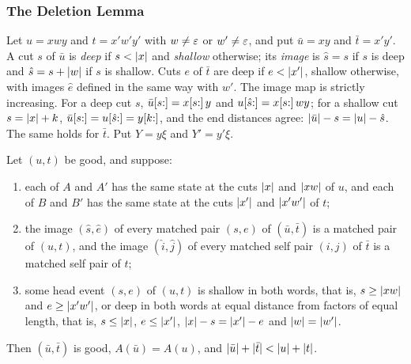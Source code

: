 \subsubsection{The Deletion Lemma}

Let $u=xwy$ and $t=x'w'y'$ with $w\ne\varepsilon$ or $w'\ne\varepsilon$, and put $\bar u=xy$
and $\bar t=x'y'$. A cut $s$ of $\bar u$ is \emph{deep} if $s<\lvert x\rvert$ and
\emph{shallow} otherwise; its \emph{image} is $\hat s=s$ if $s$ is deep and
$\hat s=s+\lvert w\rvert$ if $s$ is shallow. Cuts $e$ of $\bar t$ are deep if
$e<\lvert x'\rvert$, shallow otherwise, with images $\hat e$ defined in the same way
with $w'$. The image map is strictly increasing. For a deep cut $s$,
$\bar u[s{:}]=x[s{:}]\,y$ and $u[\hat s{:}]=x[s{:}]\,wy$; for a shallow
cut $s=\lvert x\rvert+k$, $\bar u[s{:}]=u[\hat s{:}]=y[k{:}]$, and the end
distances agree: $\lvert \bar u\rvert-s=\lvert u\rvert-\hat s$. The same holds for $\bar t$. Put
$Y=y\xi$ and $Y'=y'\xi$.

\begin{lemma}[Deletion]\label{lem:nm-deletion}
Let $(u,t)$ be good, and suppose:
\begin{enumerate}[label=(D\arabic*)]
\item each of $A$ and $A'$ has the same state at the cuts $\lvert x\rvert$ and
$\lvert xw\rvert$ of $u$, and each of $B$ and $B'$ has the same state at the cuts
$\lvert x'\rvert$ and $\lvert x'w'\rvert$ of $t$;
\item the image $(\hat s,\hat e)$ of every matched pair $(s,e)$ of
$(\bar u,\bar t)$ is a matched pair of $(u,t)$, and the image $(\hat i,\hat j)$
of every matched self pair $(i,j)$ of $\bar t$ is a matched self pair of $t$;
\item some head event $(s,e)$ of $(u,t)$ is shallow in both words, that is,
$s\ge\lvert xw\rvert$ and $e\ge\lvert x'w'\rvert$, or deep in both words at equal distance
from factors of equal length, that is, $s\le\lvert x\rvert$, $e\le\lvert x'\rvert$,
$\lvert x\rvert-s=\lvert x'\rvert-e$ and $\lvert w\rvert=\lvert w'\rvert$.
\end{enumerate}
Then $(\bar u,\bar t)$ is good, $A(\bar u)=A(u)$, and
$\lvert \bar u\rvert+\lvert \bar t\rvert<\lvert u\rvert+\lvert t\rvert$.
\end{lemma}

